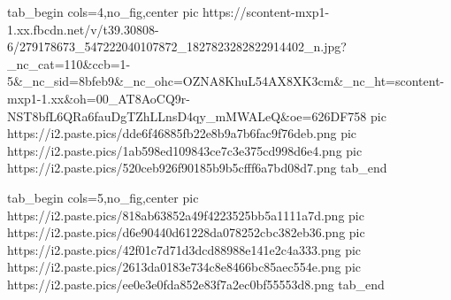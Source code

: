  
 
 
 
 

\ifcmt
  tab_begin cols=4,no_fig,center
     pic https://scontent-mxp1-1.xx.fbcdn.net/v/t39.30808-6/279178673_547222040107872_1827823282822914402_n.jpg?_nc_cat=110&ccb=1-5&_nc_sid=8bfeb9&_nc_ohc=OZNA8KhuL54AX8XK3cm&_nc_ht=scontent-mxp1-1.xx&oh=00_AT8AoCQ9r-NST8bfL6QRa6fauDgTZhLLnsD4qy_mMWALeQ&oe=626DF758
		 pic https://i2.paste.pics/dde6f46885fb22e8b9a7b6fac9f76deb.png
		 pic https://i2.paste.pics/1ab598ed109843ce7c3e375cd998d6e4.png
     pic https://i2.paste.pics/520ceb926f90185b9b5cfff6a7bd08d7.png
  tab_end
\fi

\ifcmt
  tab_begin cols=5,no_fig,center
     pic https://i2.paste.pics/818ab63852a49f4223525bb5a1111a7d.png
     pic https://i2.paste.pics/d6e90440d61228da078252cbc382eb36.png
		 pic https://i2.paste.pics/42f01c7d71d3dcd88988e141e2c4a333.png
		 pic https://i2.paste.pics/2613da0183e734c8e8466bc85aec554e.png
		 pic https://i2.paste.pics/ee0e3e0fda852e83f7a2ec0bf55553d8.png
  tab_end
\fi
